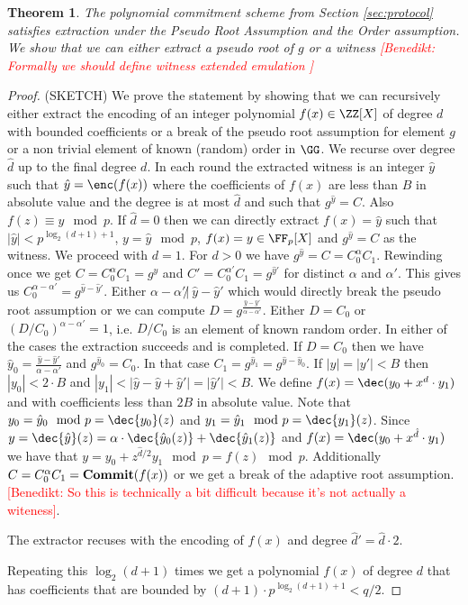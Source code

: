 \documentclass{article}
\newtheorem{theorem}{Theorem}
\newcommand{\benedikt}[1]{{\textcolor{red}{[Benedikt: #1]}}}
\newcommand{\benedikt}[1]{}
\begin{document}
\begin{theorem}
	The polynomial commitment scheme from Section \ref{sec:protocol} satisfies extraction under the Pseudo Root Assumption and the Order assumption. We show that we can either extract a pseudo root of $g$ or a witness \benedikt{Formally we should define witness extended emulation }
\end{theorem}
\begin{proof}
(SKETCH)
We prove the statement by showing that we can recursively either extract the encoding of an integer polynomial $f(x) \in \ZZ[X]$ of degree $d$ with bounded coefficients or a break of the pseudo root assumption for element $g$ or a non trivial element of known (random) order in $\GG$. We recurse over degree $\hat{d}$ up to the final degree $d$.
In each round the extracted witness is an integer $\hat{y}$ such that $\hat{y}=\enc(f(x))$ where the coefficients of $f(x)$ are less than $B$ in absolute value and the degree is at most $\hat{d}$ and such that $g^{\hat{y}}=C$. Also $f(z) \equiv y \mod p$.
If $\hat{d}=0$ then we can directly extract $f(x)=\hat{y}$ such that $\vert \hat{y} \vert < p^{\log_2(d+1)+1}$, $y=\hat{y}\mod p$, $f(x)=y\in \FF_p[X]$ and $g^{\hat{y}}=C$ as the witness. We proceed with $d=1$.
For $d>0$ we have $g^{\hat{y}}=C=C_0^{\alpha}C_1$. Rewinding once we get 
 $C=C_0^{\alpha}C_1=g^{\hat{y}}$ and $C'=C_0^{\alpha'}C_1=g^{\hat{y}'}$ for distinct $\alpha$ and $\alpha'$. 
 This gives us $C_0^{\alpha-\alpha'}=g^{\hat{y}-\hat{y}'}$. 
 Either $\alpha-\alpha' \not|~ \hat{y}-\hat{y}' $ which would directly break the pseudo root assumption or we can compute $D=g^{\frac{\hat{y}-\hat{y}'}{\alpha-\alpha'}}$. Either $D=C_0$ or $(D/C_0)^{\alpha-\alpha'}=1$, i.e. $D/C_0$ is an element of known random order. In either of the cases the extraction succeeds and is completed.
 If $D=C_0$ then we have $\hat{y}_0=\frac{\hat{y}-\hat{y}'}{\alpha-\alpha'}$ and
 $g^{\hat{y}_0}=C_0$. In that case $C_1=g^{\hat{y}_1}=g^{\hat{y}-\hat{y}_0}$. If $|y|=|y'|<B$ then $|y_0|<  2 \cdot B$ and $|y_1|<|\hat{y}-\hat{y}+\hat{y}'|=|\hat{y}'|<B$. 
 We define $f(x)=\dec(y_0+x^{d} \cdot y_1)$ and with coefficients less than $2B$ in absolute value. 
 Note that $y_0=\hat{y}_0 \mod p=\dec{y_0}(z)$ and $y_1=\hat{y}_1 \mod p=\dec{y_1}(z)$. Since $y=\dec{\hat{y}}(z)=\alpha \cdot \dec{\hat{y}_0(z)}+\dec{\hat{y}_1(z)}$ and $f(x)=\dec(y_0+x^{\hat{d}} \cdot y_1)$ we have that $y=y_0 +z^{\hat{d}/2}y_1 \mod p=f(z) \mod p$.
 Additionally $C=C_0^{\alpha}C_1=\textbf{{Commit}}(f(x))$ or we get a break of the adaptive root assumption.\benedikt{So this is technically a bit difficult because it's not actually a witeness}.
 
 The extractor recuses with the encoding of $f(x)$ and degree $\hat{d}'=\hat{d}\cdot 2$.
 
 Repeating this $\log_2(d+1)$ times we get a polynomial $f(x)$ of degree $d$ that has coefficients that are bounded by $(d+1) \cdot p^{\log_2(d+1)+1} <q/2$. 
 


\end{proof}
\end{document}
